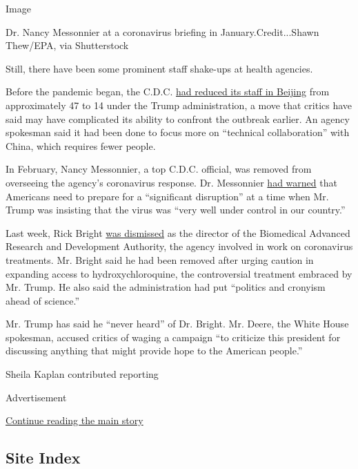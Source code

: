 Image

Dr. Nancy Messonnier at a coronavirus briefing in January.Credit...Shawn
Thew/EPA, via Shutterstock

Still, there have been some prominent staff shake-ups at health
agencies.

Before the pandemic began, the C.D.C.
\href{https://www.reuters.com/article/us-health-coronavirus-china-cdc-exclusiv/exclusive-u-s-slashed-cdc-staff-inside-china-prior-to-coronavirus-outbreak-idUSKBN21C3N5}{had
reduced its staff in Beijing} from approximately 47 to 14 under the
Trump administration, a move that critics have said may have complicated
its ability to confront the outbreak earlier. An agency spokesman said
it had been done to focus more on ``technical collaboration'' with
China, which requires fewer people.

In February, Nancy Messonnier, a top C.D.C. official, was removed from
overseeing the agency's coronavirus response. Dr. Messonnier
\href{https://www.nytimes3xbfgragh.onion/2020/03/07/us/politics/trump-coronavirus.html}{had
warned} that Americans need to prepare for a ``significant disruption''
at a time when Mr. Trump was insisting that the virus was ``very well
under control in our country.''

Last week, Rick Bright
\href{https://www.nytimes3xbfgragh.onion/2020/04/22/us/politics/rick-bright-trump-hydroxychloroquine-coronavirus.html}{was
dismissed} as the director of the Biomedical Advanced Research and
Development Authority, the agency involved in work on coronavirus
treatments. Mr. Bright said he had been removed after urging caution in
expanding access to hydroxychloroquine, the controversial treatment
embraced by Mr. Trump. He also said the administration had put
``politics and cronyism ahead of science.''

Mr. Trump has said he ``never heard'' of Dr. Bright. Mr. Deere, the
White House spokesman, accused critics of waging a campaign ``to
criticize this president for discussing anything that might provide hope
to the American people.''

Sheila Kaplan contributed reporting

Advertisement

\protect\hyperlink{after-bottom}{Continue reading the main story}

\hypertarget{site-index}{%
\subsection{Site Index}\label{site-index}}

